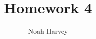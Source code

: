 \documentclass[a4paper,titlepage]{article}
\begin{document}
	\title{Homework 4}
	\author{Noah Harvey}
	\maketitle

	\pagebreak

	

\end{document}
